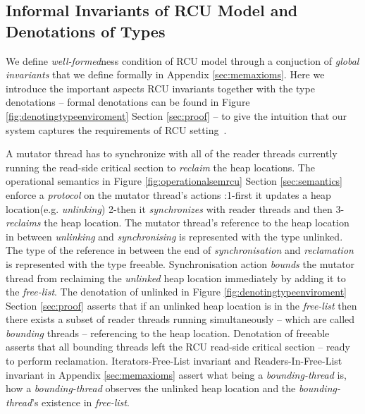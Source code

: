 \subsection{Informal Invariants of RCU Model and Denotations of Types}
\label{sec:lemmas}
We define \textit{well-formed}ness condition of RCU model through a conjuction of \textit{global invariants} that we define formally in Appendix \ref{sec:memaxioms}. Here we introduce the important aspects RCU invariants together with the type denotations -- formal denotations can be found in Figure \ref{fig:denotingtypeenviroment} Section \ref{sec:proof} -- to give the intuition that our system captures the requirements of RCU setting~\cite{abssem}.

 A mutator thread has to synchronize with all of the reader threads currently running the read-side critical section to \textit{reclaim} the heap locations. The operational semantics in Figure \ref{fig:operationalsemrcu} Section \ref{sec:semantics} enforce a \textit{protocol} on the mutator thread's actions :1-first it updates a heap location(e.g. \textit{unlinking}) 2-then it \textit{synchronizes} with reader threads and then 3-\textit{reclaims} the heap location. The mutator thread's reference to the heap location in between \textit{unlinking} and \textit{synchronising} is represented with the type \textsf{unlinked}. The type of the reference in between the end of \textit{synchronisation} and \textit{reclamation} is represented with the type \textsf{freeable}. Synchronisation action \textit{bounds} the mutator thread from reclaiming the \textit{unlinked} heap location immediately by adding it to the \textit{free-list}. The denotation of \textsf{unlinked} in Figure \ref{fig:denotingtypeenviroment} Section \ref{sec:proof} asserts that if an \textsf{unlinked} heap location is in the \textit{free-list} then there exists a subset of reader threads running simultaneously -- which are called \textit{bounding} threads -- referencing to the heap location. Denotation of \textsf{freeable} asserts that all bounding threads left the RCU read-side critical section -- ready to perform reclamation. \textsf{Iterators-Free-List} invariant and \textsf{Readers-In-Free-List} invariant in Appendix \ref{sec:memaxioms} assert what being a \textit{bounding-thread} is, how a \textit{bounding-thread} observes the \textsf{unlinked} heap location and the \textit{bounding-thread}'s existence in \textit{free-list}.


